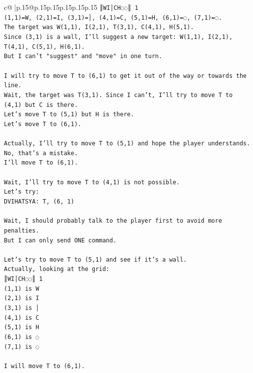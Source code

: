 \documentclass{article}
\begin{document}
{\begin{supertabular}{c@{$\;$}|p{.15\linewidth}@{}p{.15\linewidth}p{.15\linewidth}p{.15\linewidth}p{.15\linewidth}p{.15\linewidth}}
{{{\texttt{║WI│CH◌◌║ 1} \\
\texttt{(1,1)=W, (2,1)=I, (3,1)=│, (4,1)=C, (5,1)=H, (6,1)=◌, (7,1)=◌.} \\
\texttt{The target was W(1,1), I(2,1), T(3,1), C(4,1), H(5,1).} \\
\texttt{Since (3,1) is a wall, I'll suggest a new target: W(1,1), I(2,1), T(4,1), C(5,1), H(6,1).} \\
\texttt{But I can't "suggest" and "move" in one turn.} \\
\\ 
\texttt{I will try to move T to (6,1) to get it out of the way or towards the line.} \\
\texttt{Wait, the target was T(3,1). Since I can't, I'll try to move T to (4,1) but C is there.} \\
\texttt{Let's move T to (5,1) but H is there.} \\
\texttt{Let's move T to (6,1).} \\
\\ 
\texttt{Actually, I'll try to move T to (5,1) and hope the player understands. No, that's a mistake.} \\
\texttt{I'll move T to (6,1).} \\
\\ 
\texttt{Wait, I'll try to move T to (4,1) is not possible.} \\
\texttt{Let's try:} \\
\texttt{DVIHATSYA: T, (6, 1)} \\
\\ 
\texttt{Wait, I should probably talk to the player first to avoid more penalties.} \\
\texttt{But I can only send ONE command.} \\
\\ 
\texttt{Let's try to move T to (5,1) and see if it's a wall.} \\
\texttt{Actually, looking at the grid:} \\
\texttt{║WI│CH◌◌║ 1} \\
\texttt{(1,1) is W} \\
\texttt{(2,1) is I} \\
\texttt{(3,1) is │} \\
\texttt{(4,1) is C} \\
\texttt{(5,1) is H} \\
\texttt{(6,1) is ◌} \\
\texttt{(7,1) is ◌} \\
\\ 
\texttt{I will move T to (6,1).} \\
}}}
\end{supertabular}}
\end{document}
